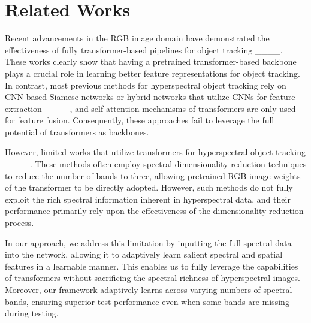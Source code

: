 \section{Related Works}
\label{sec:format}
Recent advancements in the RGB image domain have demonstrated the effectiveness of fully transformer-based pipelines for object tracking ____. These works clearly show that having a pretrained transformer-based backbone plays a crucial role in learning better feature representations for object tracking. In contrast, most previous methods for hyperspectral object tracking rely on CNN-based Siamese networks or hybrid networks that utilize CNNs for feature extraction ____, and self-attention mechanisms of transformers are only used for feature fusion. Consequently, these approaches fail to leverage the full potential of transformers as backbones.

However, limited works that utilize transformers for hyperspectral object tracking ____. These methods often employ spectral dimensionality reduction techniques to reduce the number of bands to three, allowing pretrained RGB image weights of the transformer to be directly adopted. However, such methods do not fully exploit the rich spectral information inherent in hyperspectral data, and their performance primarily rely upon the effectiveness of the dimensionality reduction process.

In our approach, we address this limitation by inputting the full spectral data into the network, allowing it to adaptively learn salient spectral and spatial features in a learnable manner. This enables us to fully leverage the capabilities of transformers without sacrificing the spectral richness of hyperspectral images. Moreover, our framework adaptively learns across varying numbers of spectral bands, ensuring superior test performance even when some bands are missing during testing. 
\vspace{-0.1cm}